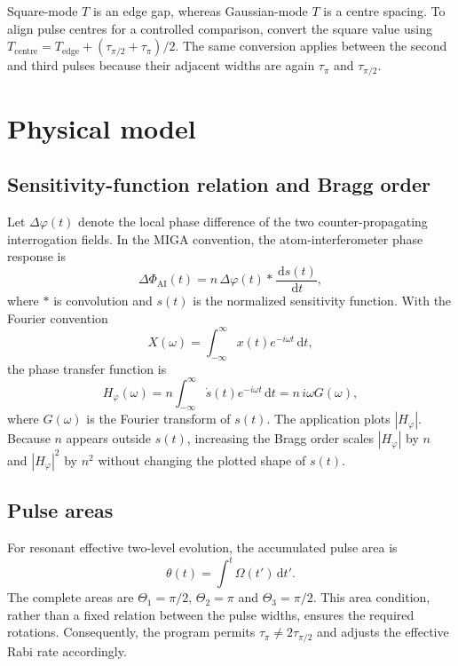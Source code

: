 \documentclass[11pt,a4paper]{article}
\newcommand{\Hphi}{H_{\varphi}}
\newcommand{\tauhalf}{\tau_{\pi/2}}
\newcommand{\taupi}{\tau_{\pi}}
\newcommand{\dd}{\,\mathrm{d}}
\begin{document}
\begin{warningbox}
Square-mode $T$ is an edge gap, whereas Gaussian-mode $T$ is a centre spacing. To align pulse centres for a controlled comparison, convert the square value using $T_{\mathrm{centre}}=T_{\mathrm{edge}}+(\tauhalf+\taupi)/2$. The same conversion applies between the second and third pulses because their adjacent widths are again $\taupi$ and $\tauhalf$.
\end{warningbox}

\section{Physical model}

\subsection{Sensitivity-function relation and Bragg order}

Let $\Delta\varphi(t)$ denote the local phase difference of the two counter-propagating interrogation fields. In the MIGA convention, the atom-interferometer phase response is\cite{Canuel2018}
\begin{equation}
\Delta\Phi_{\mathrm{AI}}(t)
=n\,\Delta\varphi(t)*\frac{\dd s(t)}{\dd t},
\label{eq:convolution}
\end{equation}
where $*$ is convolution and $s(t)$ is the normalized sensitivity function. With the Fourier convention
\begin{equation}
X(\omega)=\int_{-\infty}^{\infty}x(t)e^{-i\omega t}\dd t,
\end{equation}
the phase transfer function is
\begin{equation}
\boxed{\Hphi(\omega)=n\int_{-\infty}^{\infty}\dot{s}(t)e^{-i\omega t}\dd t
=n\,i\omega G(\omega)},
\label{eq:Hgeneral}
\end{equation}
where $G(\omega)$ is the Fourier transform of $s(t)$. The application plots $|\Hphi|$. Because $n$ appears outside $s(t)$, increasing the Bragg order scales $|\Hphi|$ by $n$ and $|\Hphi|^2$ by $n^2$ without changing the plotted shape of $s(t)$.

\subsection{Pulse areas}

For resonant effective two-level evolution, the accumulated pulse area is
\begin{equation}
\theta(t)=\int^t \Omega(t')\dd t'.
\end{equation}
The complete areas are $\Theta_1=\pi/2$, $\Theta_2=\pi$ and $\Theta_3=\pi/2$. This area condition, rather than a fixed relation between the pulse widths, ensures the required rotations. Consequently, the program permits $\taupi\neq2\tauhalf$ and adjusts the effective Rabi rate accordingly.
\end{document}
